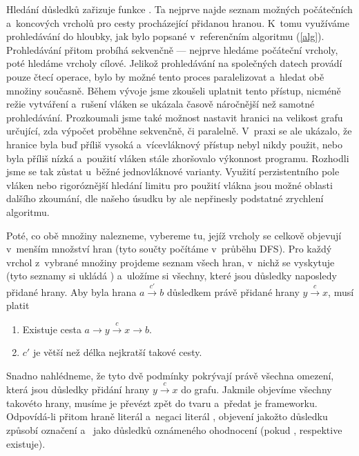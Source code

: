 Hledání důsledků zařizuje funkce . Ta nejprve najde seznam možných počátečních a~koncových vrcholů pro cesty procházející přidanou hranou. K~tomu využíváme prohledávání do hloubky, jak bylo popsané v~referenčním algoritmu (\ref{alg}). Prohledávání přitom probíhá sekvenčně --- nejprve hledáme počáteční vrcholy, poté hledáme vrcholy cílové. Jelikož prohledávání na společných datech provádí pouze čtecí operace, bylo by možné tento proces paralelizovat a~hledat obě množiny současně. Během vývoje jsme zkoušeli uplatnit tento přístup, nicméně režie vytváření a~rušení vláken  se ukázala časově náročnější než samotné prohledávání. Prozkoumali jsme také možnost nastavit hranici na velikost grafu určující, zda výpočet proběhne sekvenčně, či paralelně. V~praxi se ale ukázalo, že hranice byla buď příliš vysoká a~vícevláknový přístup nebyl nikdy použit, nebo byla příliš nízká a~použití vláken stále zhoršovalo výkonnost programu. Rozhodli jsme se tak zůstat u~běžné jednovláknové varianty. Využití perzistentního pole vláken nebo rigoróznější hledání limitu pro použití vlákna jsou možné oblasti dalšího zkoumání, dle našeho úsudku by ale nepřinesly podstatné zrychlení algoritmu.

Poté, co obě množiny nalezneme, vybereme tu, jejíž vrcholy se celkově objevují v~menším množství hran (tyto součty počítáme v~průběhu DFS). Pro každý vrchol z~vybrané množiny projdeme seznam všech hran, v~nichž se vyskytuje (tyto seznamy si ukládá ) a~uložíme si všechny, které jsou důsledky naposledy přidané hrany. Aby byla hrana $a \xrightarrow{c'} b$ důsledkem právě přidané hrany $y \xrightarrow{c} x$, musí platit 
\begin{enumerate}
	\item Existuje cesta $a \rightarrow y \xrightarrow{c} x \rightarrow b$.
	\item $c'$ je větší než délka nejkratší takové cesty.
\end{enumerate}

Snadno nahlédneme, že tyto dvě podmínky pokrývají právě všechna omezení, která jsou důsledky přidání hrany $y \xrightarrow{c} x$ do grafu. Jakmile objevíme všechny takovéto hrany, musíme je převézt zpět do tvaru  a~předat je frameworku. Odpovídá-li přitom hraně  literál  a~negaci  literál , objevení  jakožto důsledku způsobí označení  a~ jako důsledků oznámeného ohodnocení (pokud , respektive  existuje). 

